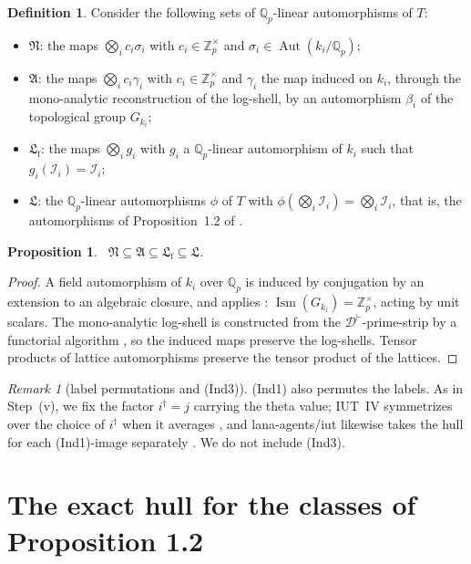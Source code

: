 \documentclass[11pt,a4paper]{article}
\newcommand{\Zp}{\mathbb{Z}_p}
\newcommand{\Qp}{\mathbb{Q}_p}
\newcommand{\I}{\mathcal{I}}
\newcommand{\Aut}{\operatorname{Aut}}
\newcommand{\Ism}{\operatorname{Ism}}
\newcommand{\cN}{\mathfrak{N}}
\newcommand{\cA}{\mathfrak{A}}
\newcommand{\cLf}{\mathfrak{L}_{\mathrm f}}
\newcommand{\cL}{\mathfrak{L}}
\newcommand{\lab}[2]{{\upshape\fcolorbox{#1}{#1!8}{\scriptsize\sffamily\bfseries\textcolor{#1}{#2}}}}
\newcommand{\tagP}{\lab{ForestGreen}{P}}
\theoremstyle{plain}
\newtheorem{proposition}[theorem]{Proposition}
\theoremstyle{definition}
\newtheorem{definition}[theorem]{Definition}
\theoremstyle{remark}
\newtheorem{remark}[theorem]{Remark}
\begin{document}
\begin{definition}\label{d:classes}
Consider the following sets of $\Qp$-linear automorphisms of $T$:
\begin{itemize}
\item $\cN$: the maps $\bigotimes_ic_i\sigma_i$ with $c_i\in\Zp^{\times}$ and $\sigma_i\in\Aut(k_i/\Qp)$;
\item $\cA$: the maps $\bigotimes_ic_i\gamma_i$ with $c_i\in\Zp^{\times}$ and $\gamma_i$ the map induced on $k_i$, through
the mono-analytic reconstruction of the log-shell, by an automorphism $\beta_i$ of the topological group $G_{k_i}$;
\item $\cLf$: the maps $\bigotimes_ig_i$ with $g_i$ a $\Qp$-linear automorphism of $k_i$ such that $g_i(\I_i)=\I_i$;
\item $\cL$: the $\Qp$-linear automorphisms $\phi$ of $T$ with $\phi(\bigotimes_i\I_i)=\bigotimes_i\I_i$, that is,
the automorphisms of Proposition~1.2 of \cite{IUT4}.
\end{itemize}
\end{definition}

\begin{proposition}\label{p:incl}
\tagP\ $\cN\subseteq\cA\subseteq\cLf\subseteq\cL$.
\end{proposition}
\begin{proof}
A field automorphism of $k_i$ over $\Qp$ is induced by conjugation by an extension to an algebraic closure, and
\cite[Prop.~9]{Fourth} applies \cite[Thm.~F, Thm.~7.4]{MT}: $\Ism(G_{k_i})=\Zp^{\times}$, acting by unit scalars.
The mono-analytic log-shell is constructed from the $\mathcal D^{\vdash}$-prime-strip by a functorial algorithm
\cite[Prop.~1.2(vi)]{IUT3}, so the induced maps preserve the log-shells. Tensor products of lattice automorphisms
preserve the tensor product of the lattices.
\end{proof}

\begin{remark}[label permutations and (Ind3)]
(Ind1) also permutes the labels. As in Step~(v), we fix the factor $i^{\dagger}=j$ carrying the theta value; IUT~IV
symmetrizes over the choice of $i^{\dagger}$ when it averages \cite[p.~28]{IUT4}, and lana-agents/iut likewise takes
the hull for each (Ind1)-image separately \cite{lana}. We do not include (Ind3).
\end{remark}

\section{The exact hull for the classes of Proposition 1.2}\label{s:exact}
\end{document}
